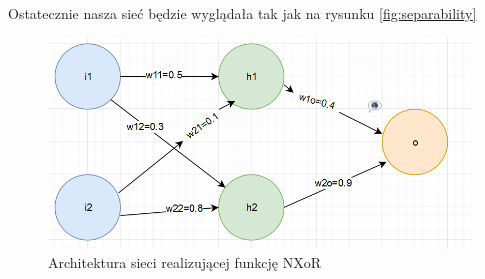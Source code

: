 Ostatecznie nasza sieć będzie wyglądała tak jak na rysunku \ref{fig:separability}

\begin{figure}[!ht]
  \includegraphics[width=\linewidth]{images/architecture.png}
  \caption{Architektura sieci realizującej funkcję NXoR}
  \label{fig:architecture}
\end{figure}


